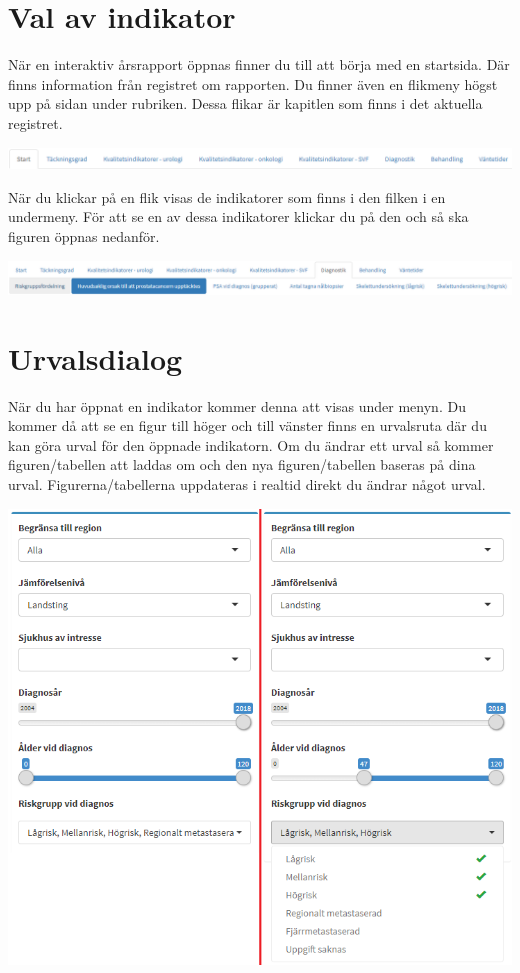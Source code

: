 \documentclass[10pt, a4paper,twoside]{report}
\begin{document}
\section{Val av indikator}
När en interaktiv årsrapport öppnas finner du till att börja med en startsida. Där finns information från registret om rapporten. Du finner även en flikmeny högst upp på sidan under rubriken. Dessa flikar är kapitlen som finns i det aktuella registret.

\includegraphics[]{figurer/Overmeny1}
\newline

När du klickar på en flik visas de indikatorer som finns i den filken i en undermeny. För att se en av dessa indikatorer klickar du på den och så ska figuren öppnas nedanför.

\includegraphics[]{figurer/Overmeny2}
\newline

\section{Urvalsdialog}
När du har öppnat en indikator kommer denna att visas under menyn. Du kommer då att se en figur till höger och till vänster finns en urvalsruta där du kan göra urval för den öppnade indikatorn. Om du ändrar ett urval så kommer figuren/tabellen att laddas om och den nya figuren/tabellen baseras på dina urval. Figurerna/tabellerna uppdateras i realtid direkt du ändrar något urval.

\includegraphics[]{figurer/Urvalsdialog_gemensam}
\newline
\end{document}
